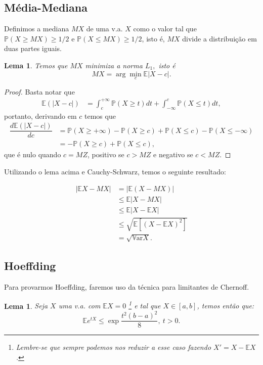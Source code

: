 \documentclass[12pt,a4paper,oneside]{book}
\newtheorem{lemma}[theorem]{Lema}
\theoremstyle{definition}
\theoremstyle{remark}
\numberwithin{equation}{section}
\newcommand{\E}{\mathbb{E}}
\newcommand{\pr}{\mathbb{P}}
\newcommand{\Var}{\mathbb{V}\text{ar}}
\begin{document}
\subsection{Média-Mediana} Definimos a mediana $MX$ de uma v.a. $X$ como o valor tal que $\pr(X\geq MX)\geq 1/2$ e $\pr(X\leq MX)\geq 1/2$, isto é, $MX$ divide a distribuição em duas partes iguais.

\begin{lemma}
Temos que $MX$ minimiza a norma $L_1, $ isto é
$$MX = \arg\min_c \E|X-c|. $$  
\end{lemma}
\begin{proof}
Basta notar que
\begin{align*}
\E(|X-c|) & = \int_c^{+\infty}\pr(X\geq t)dt + \int^c_ {-\infty}\pr(X\leq  t)dt,
\end{align*}
portanto, derivando em $c$ temos que
\begin{align*}
\dfrac{d\E(|X-c|)}{dc} & = \pr(X\geq +\infty) -\pr(X\geq c) + \pr(X\leq c)-\pr(X\leq -\infty)\\
& = -\pr(X\geq c) + \pr(X\leq c),
\end{align*}
que é nulo quando $c=MZ$, positivo se $c>MZ$ e negativo se $c<MZ$.
\end{proof}


Utilizando o lema acima e Cauchy-Schwarz, temos o seguinte resultado:
\begin{tcolorbox}
\begin{align*}
|\E X- MX| & = |\E(X-MX)|\\
 &\leq \E|X-MX|\\
		&\leq \E |X-\E X| \\
		&\leq \sqrt{\E[(X-\E X)^2]}\\ 
		&= \sqrt{\Var X}.
\end{align*}
\end{tcolorbox}







\subsection{Hoeffding}
Para provarmos Hoeffding, faremos uso da técnica para limitantes de Chernoff.

\begin{lemma}
Seja $X$ uma v.a. com $\E X=0$  \footnote{Lembre-se que sempre podemos nos reduzir a esse caso fazendo $X' = X-\E X$.} e tal que $X\in [a,b]$, temos então que:
$$\E e^{tX} \leq \exp{\dfrac{t^2(b-a)^2}{8}},\ t>0. $$
\end{lemma}
\end{document}
